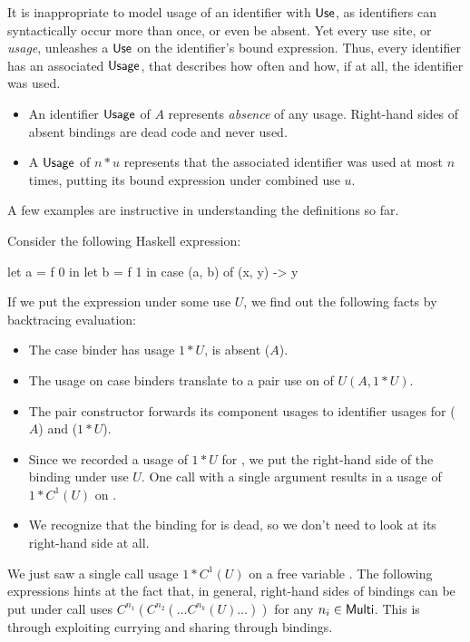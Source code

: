 It is inappropriate to model usage of an identifier with $\text{\textsf{Use}}$, as identifiers can syntactically occur more than once, or even be absent. 
Yet every use site, or \emph{usage}, unleashes a $\text{\textsf{Use}}$ on the identifier's bound expression. 
Thus, every identifier has an associated $\text{\textsf{Usage}}$, that describes how often and how, if at all, the identifier was used.

\begin{itemize}
\item An identifier $\text{\textsf{Usage}}$ of $A$ represents \emph{absence} of any usage. Right-hand sides of absent bindings are dead code and never used.
\item A $\text{\textsf{Usage}}$ of $n*u$ represents that the associated identifier was used at most $n$ times, putting its bound expression under combined use $u$.
\end{itemize}

A few examples are instructive in understanding the definitions so far.

\begin{example} 
Consider the following Haskell expression:

\begin{haskellcode}
let a = f 0 
in let b = f 1 
   in case (a, b) of
        (x, y) -> y
\end{haskellcode}

If we put the expression under some use $U$, we find out the following facts by backtracing evaluation:

\begin{itemize}
\item The case binder  has usage $1*U$,  is absent ($A$).
\item The usage on case binders translate to a pair use on  of $U(A,1*U)$.
\item The pair constructor forwards its component usages to identifier usages for  ($A$) and  ($1*U$).
\item Since we recorded a usage of $1*U$ for , we put the right-hand side of the binding under use $U$. 
      One call with a single argument results in a usage of $1*C^1(U)$ on .
\item We recognize that the binding for  is dead, so we don't need to look at its right-hand side at all.
\end{itemize}
\end{example}

We just saw a single call usage $1*C^1(U)$ on a free variable . 
The following expressions hints at the fact that, in general, right-hand sides of bindings can be put under call uses $C^{n_1}(C^{n_2}(\ldots C^{n_k}(U)\ldots))$ for any $n_i\in\text{\textsf{Multi}}$.
This is through exploiting currying and sharing through bindings.


